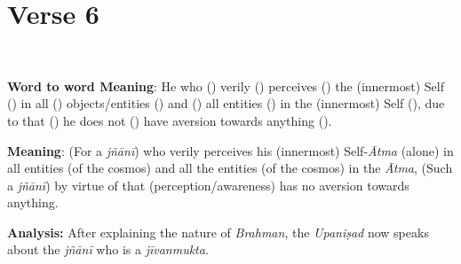 \chapter{Verse 6}

\begin{moolashloka}
\\
\end{moolashloka}

\textbf{Word to word Meaning}: He who () verily () perceives () the (innermost) Self () in all () objects/entities () and () all entities () in the (innermost) Self (), due to that () he does not () have aversion towards anything ().

\textbf{Meaning}: (For a \emph{jñānī}) who verily perceives his (innermost) Self-\emph{Ātma} (alone) in all entities (of the cosmos) and all the entities (of the cosmos) in the \emph{Ātma}, (Such a \emph{jñānī}) by virtue of that (perception/awareness) has no aversion towards anything.

\textbf{Analysis:} After explaining the nature of \emph{Brahman}, the \emph{Upaniṣad} now speaks about the \emph{jñānī} who is a \emph{jīvanmukta}.

